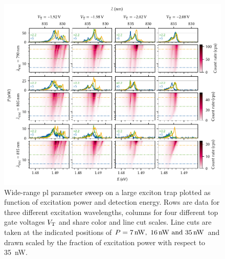 \begin{figure}
    \centering
    \includegraphics{img/pdf/experiment/doped_M1_05_49-2_multiplets}
    \caption[
        .
        \protect\newline
    ]{
        Wide-range \gls{pl} parameter sweep on a large exciton trap plotted as function of excitation power and detection energy.
        Rows are data for three different excitation wavelengths, columns for four different top gate voltages $V_{\mathrm{T}}$ and share color and line cut scales.
        Line cuts are taken at the indicated positions of $P = \qtylist{7;16;35}{\nano\watt}$ and drawn scaled by the fraction of excitation power with respect to \qty{35}{\nano\watt}.
    }
    \label{fig:exp:pl:doped_M1_05_49-2_multiplets}
\end{figure}
